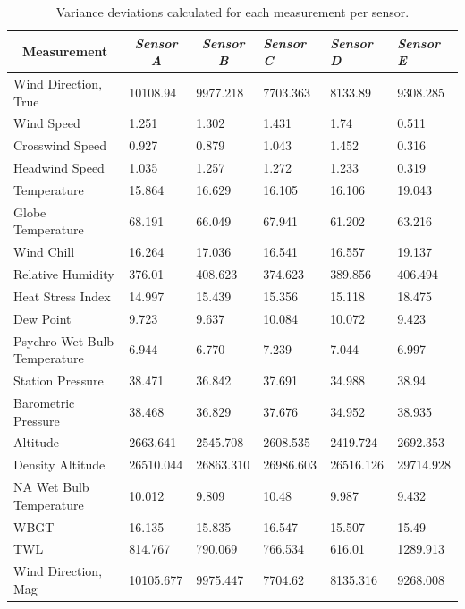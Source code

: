 \documentclass[a4paper,12pt]{article} %
\begin{document}
\begin{enumerate}
\begin{table}[H]
\centering
\caption{Variance deviations calculated for each measurement per sensor.}
\begin{tabular}{llllll}
\multicolumn{1}{c}{\textbf{Measurement}} & \multicolumn{1}{c}{\textit{Sensor A}} & \multicolumn{1}{c}{\textit{Sensor B}} & \textit{Sensor C} & \textit{Sensor D} & \textit{Sensor E}  \\ \hline
Wind Direction‚ True             & 10108.94  & 9977.218  & 7703.363  & 8133.89   & 9308.285  \\
Wind Speed                   & 1.251     & 1.302     & 1.431     & 1.74      & 0.511     \\
Crosswind Speed              & 0.927     & 0.879     & 1.043     & 1.452     & 0.316     \\
Headwind Speed               & 1.035     & 1.257     & 1.272     & 1.233     & 0.319     \\
Temperature                  & 15.864    & 16.629    & 16.105    & 16.106    & 19.043    \\
Globe Temperature            & 68.191    & 66.049    & 67.941    & 61.202    & 63.216    \\
Wind Chill                   & 16.264    & 17.036    & 16.541    & 16.557    & 19.137    \\
Relative Humidity            & 376.01    & 408.623   & 374.623   & 389.856   & 406.494   \\
Heat Stress Index            & 14.997    & 15.439    & 15.356    & 15.118    & 18.475    \\
Dew Point                    & 9.723     & 9.637     & 10.084    & 10.072    & 9.423     \\
Psychro Wet Bulb Temperature & 6.944     & 6.770      & 7.239     & 7.044     & 6.997     \\
Station Pressure             & 38.471    & 36.842    & 37.691    & 34.988    & 38.94     \\
Barometric Pressure          & 38.468    & 36.829    & 37.676    & 34.952    & 38.935    \\
Altitude                     & 2663.641  & 2545.708  & 2608.535  & 2419.724  & 2692.353  \\
Density Altitude             & 26510.044 & 26863.310  & 26986.603 & 26516.126 & 29714.928 \\
NA Wet Bulb Temperature      & 10.012    & 9.809     & 10.48     & 9.987     & 9.432     \\
WBGT                         & 16.135    & 15.835    & 16.547    & 15.507    & 15.49     \\
TWL                          & 814.767   & 790.069   & 766.534   & 616.01    & 1289.913  \\
Wind Direction‚ Mag              & 10105.677 & 9975.447  & 7704.62   & 8135.316  & 9268.008 
\end{tabular}
\label{var-table}
\end{table}


\end{enumerate}
\end{document}
